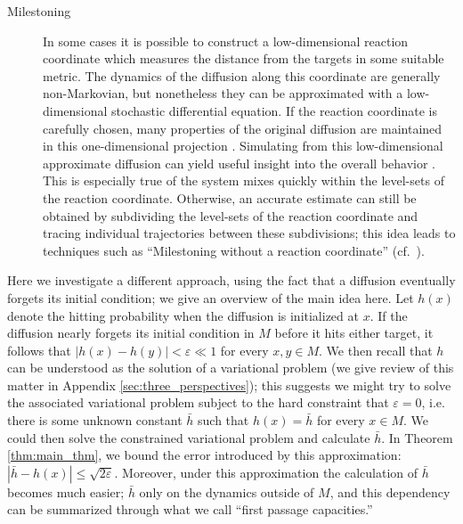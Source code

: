 \documentclass[12pt, nofootinbib,english, amsmath, amssymb, aps, priprint, graphicx,floatfix]{revtex4-1}
\theoremstyle{plain}
\theoremstyle{definition}
\theoremstyle{plain}
\begin{document}
\begin{description}
    \item[Milestoning] In some cases it is possible to construct a low-dimensional reaction coordinate which measures the distance from the targets in some suitable metric.  The dynamics of the diffusion along this coordinate are generally non-Markovian, but nonetheless they can be approximated with a low-dimensional stochastic differential equation.  If the reaction coordinate is carefully chosen, many properties of the original diffusion are maintained in this one-dimensional projection \cite{E2006-fm}.  Simulating from this low-dimensional approximate diffusion can yield useful insight into the overall behavior \cite{Bello-Rivas2015-ld}.  This is especially true of the system mixes quickly within the level-sets of the reaction coordinate.  Otherwise, an accurate estimate can still be obtained by subdividing the level-sets of the reaction coordinate and tracing individual trajectories between these subdivisions; this idea leads to techniques such as ``Milestoning without a reaction coordinate'' (cf.\  \cite{Majek2010-uy}).
\end{description}

Here we investigate a different approach, using the fact that a diffusion eventually forgets its initial condition; we give an overview of the main idea here.  Let $h(x)$ denote the hitting probability when the diffusion is initialized at $x$.  If the diffusion nearly forgets its initial condition in $M$ before it hits either target, it follows that $|h(x)- h(y)|<\varepsilon\ll 1$ for every $x,y\in M$.  We then recall that $h$ can be understood as the solution of a variational problem (we give review of this matter in Appendix \ref{sec:three_perspectives}); this suggests we might try to solve the associated variational problem subject to the hard constraint that $\varepsilon=0$, i.e. there is some unknown constant $\bar h$ such that $h(x)=\bar h$ for every $x\in M$.  We could then solve the constrained variational problem and calculate $\bar h$.  In Theorem \ref{thm:main_thm}, we bound the error introduced by this approximation: $|\bar h - h(x) |\leq \sqrt{2\varepsilon}$.  Moreover, under this approximation the calculation of $\bar h$ becomes much easier; $\bar h$ only on the dynamics outside of $M$, and this dependency can be summarized through what we call ``first passage capacities.''
\end{document}
